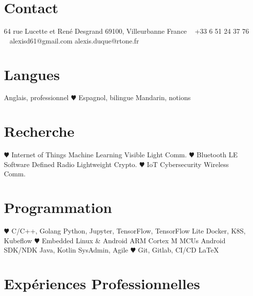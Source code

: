 \documentclass[]{cv-style}          %
\begin{document}
\lastupdated


\begin{aside}
%
\section{Contact}
64 rue Lucette et René Desgrand
69100, Villeurbanne
France
~
+33 6 51 24 37 76
~
alexisd61@gmail.com
alexis.duque@rtone.fr
%
\section{Langues}
Anglais, professionnel
{\color{red} $\varheartsuit$} Espagnol, bilingue
Mandarin, notions
%
\section{Recherche}
{\color{red} $\varheartsuit$} Internet of Things
Machine Learning
Visible Light Comm.
{\color{red} $\varheartsuit$} Bluetooth LE
Software Defined Radio
Lightweight Crypto.
{\color{red} $\varheartsuit$} IoT Cybersecurity
Wireless Comm.
%
\section{Programmation}
{\color{red} $\varheartsuit$} C/C++, Golang
Python, Jupyter, TensorFlow, TensorFlow Lite
Docker, K8S, Kubeflow
{\color{red} $\varheartsuit$} Embedded Linux \& Android
ARM Cortex M MCUs
Android SDK/NDK
Java, Kotlin
SysAdmin, Agile
{\color{red} $\varheartsuit$} Git, Gitlab, CI/CD
\LaTeX{}
%
\end{aside}



 \vspace{0.15cm}

\section{Expériences Professionnelles}
\end{document}
